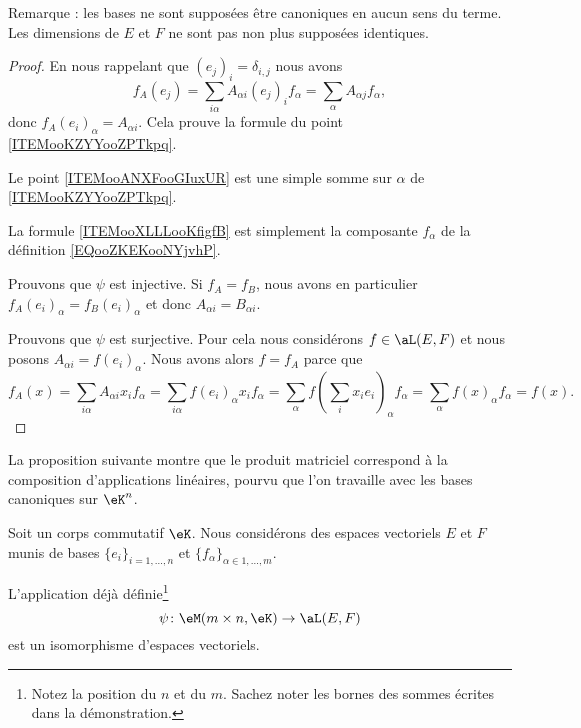 Remarque : les bases ne sont supposées être canoniques en aucun sens du terme. Les dimensions de \( E\) et \( F\) ne sont pas non plus supposées identiques.

\begin{proof}
	En nous rappelant que \( (e_j)_i=\delta_{i,j}\) nous avons
	\begin{equation}        \label{EQooWGZHooIBoygB}
		f_A(e_j)=\sum_{i\alpha}A_{\alpha i}(e_j)_if_{\alpha}=\sum_{\alpha}A_{\alpha j}f_{\alpha},
	\end{equation}
	donc \( f_A(e_i)_{\alpha}=A_{\alpha i}\). Cela prouve la formule du point \ref{ITEMooKZYYooZPTkpq}.

	Le point \ref{ITEMooANXFooGIuxUR} est une simple somme sur \( \alpha\) de \ref{ITEMooKZYYooZPTkpq}.

	La formule \eqref{ITEMooXLLLooKfigfB} est simplement la composante \( f_{\alpha}\) de la définition \ref{EQooZKEKooNYjvhP}.

	Prouvons que \( \psi\) est injective. Si \( f_A=f_B\), nous avons en particulier \( f_A(e_i)_{\alpha}=f_B(e_i)_{\alpha}\) et donc \( A_{\alpha i}=B_{\alpha i}\).

	Prouvons que \( \psi\) est surjective. Pour cela nous considérons \( f\in \aL(E,F)\) et nous posons \( A_{\alpha i}=f(e_i)_{\alpha}\). Nous avons alors \( f=f_A\) parce que
	\begin{equation}
		f_A(x)=\sum_{i\alpha}A_{\alpha i}x_if_{\alpha}=\sum_{i\alpha}f(e_i)_{\alpha}x_if_{\alpha}=\sum_{\alpha}f(\sum_ix_ie_i)_{\alpha}f_{\alpha}=\sum_{\alpha}f(x)_{\alpha}f_{\alpha}=f(x).
	\end{equation}
\end{proof}

La proposition suivante montre que le produit matriciel correspond à la composition d'applications linéaires, pourvu que l'on travaille avec les bases canoniques sur \( \eK^n\).
\begin{proposition}      \label{PROPooIYVQooOiuRhX}
	Soit un corps commutatif \( \eK\). Nous considérons des espaces vectoriels \( E\) et \( F\) munis de bases \( \{ e_i \}_{i=1,\ldots, n}\) et \( \{ f_{\alpha}\}_{\alpha\in 1,\ldots, m} \).

	L'application déjà définie\footnote{Notez la position du \( n\) et du \( m\). Sachez noter les bornes des sommes écrites dans la démonstration.}
	\begin{equation}
		\psi\colon \eM(m\times n,\eK)\to \aL(E,F)
	\end{equation}
	est un isomorphisme d'espaces vectoriels.
\end{proposition}

